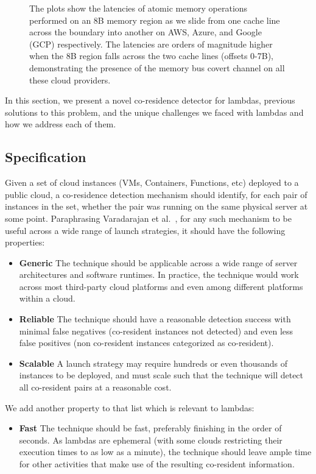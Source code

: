 \begin{figure}[h!]
\begin{subfigure}{.33\textwidth}
\end{subfigure}
\caption{The plots show the latencies of atomic memory operations performed on
        an 8B memory region as we slide from one cache line across the boundary into
        another on AWS, Azure, and Google (GCP) respectively.  The latencies are orders
        of magnitude higher when the 8B region falls across the two cache lines (offsets
        0-7B), demonstrating the presence of the memory bus covert channel on all these
        cloud providers. \label{fig:membus_clouds}}
\label{fig:fig}
\end{figure}


In this section, we present a novel co-residence detector for lambdas, previous 
solutions to this problem, and the unique challenges we faced with lambdas and
how we address each of them.

\subsection{Specification}
Given a set of cloud instances (VMs, Containers, Functions, etc) deployed to a
public cloud, a co-residence detection mechanism should identify, for each pair
of instances in the set, whether the pair was running on the same physical
server at some point. Paraphrasing Varadarajan et al.~\cite{varadarajan2015},
for any such mechanism to be useful across a wide range of launch strategies, it
should have the following properties:

\begin{itemize}
    \item \textbf{Generic} The technique should be applicable across a wide
    range of server architectures and software runtimes. In practice, the
    technique would work across most third-party cloud platforms and even 
    among different platforms within a cloud.
    \item \textbf{Reliable} The technique should have a reasonable detection success
    with minimal false negatives (co-resident instances not detected) and even 
    less false positives (non co-resident instances categorized as co-resident).
    \item \textbf{Scalable} A launch strategy may require hundreds or even
    thousands of instances to be deployed, and must scale such that the
    technique will detect all co-resident pairs at a reasonable cost.
\end{itemize}

\noindent We add another property to that list which is relevant to lambdas:
\begin{itemize}
    \item \textbf{Fast} The technique should be fast, preferably finishing in 
    the order of seconds. As lambdas are ephemeral (with some clouds restricting their 
    execution times to as low as a minute), the technique should leave ample time 
    for other activities that make use of the resulting co-resident information.
\end{itemize}


